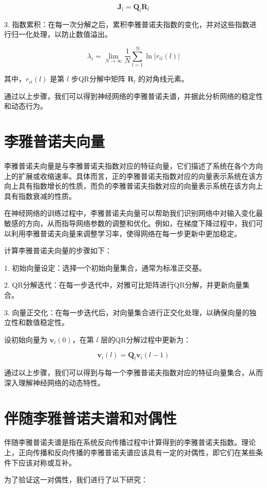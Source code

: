\[ \mathbf{J}_l = \mathbf{Q}_l \mathbf{R}_l \]

3. 指数累积：在每一次分解之后，累积李雅普诺夫指数的变化，并对这些指数进行归一化处理，以防止数值溢出。

\[ \lambda_i = \lim_{N \to \infty} \frac{1}{N} \sum_{l=1}^N \ln |r_{ii}(l)| \]

其中，\(r_{ii}(l)\) 是第 \(l\) 步QR分解中矩阵 \(\mathbf{R}_l\) 的对角线元素。

通过以上步骤，我们可以得到神经网络的李雅普诺夫谱，并据此分析网络的稳定性和动态行为。

\section{李雅普诺夫向量}

李雅普诺夫向量是与李雅普诺夫指数对应的特征向量，它们描述了系统在各个方向上的扩展或收缩速率。具体而言，正的李雅普诺夫指数对应的向量表示系统在该方向上具有指数增长的性质，而负的李雅普诺夫指数对应的向量表示系统在该方向上具有指数衰减的性质。

在神经网络的训练过程中，李雅普诺夫向量可以帮助我们识别网络中对输入变化最敏感的方向，从而指导网络参数的调整和优化。例如，在梯度下降过程中，我们可以利用李雅普诺夫向量来调整学习率，使得网络在每一步更新中更加稳定。

计算李雅普诺夫向量的步骤如下：

1. 初始向量设定：选择一个初始向量集合，通常为标准正交基。
   
2. QR分解迭代：在每一步迭代中，对雅可比矩阵进行QR分解，并更新向量集合。
   
3. 向量正交化：在每一步迭代后，对向量集合进行正交化处理，以确保向量的独立性和数值稳定性。

设初始向量为 \(\mathbf{v}_i(0)\)，在第 \(l\) 层的QR分解过程中更新为：

\[ \mathbf{v}_i(l) = \mathbf{Q}_l \mathbf{v}_i(l-1) \]

通过以上步骤，我们可以得到与每一个李雅普诺夫指数对应的特征向量集合，从而深入理解神经网络的动态特性。

\section{伴随李雅普诺夫谱和对偶性}

伴随李雅普诺夫谱是指在系统反向传播过程中计算得到的李雅普诺夫指数。理论上，正向传播和反向传播的李雅普诺夫谱应该具有一定的对偶性，即它们在某些条件下应该对称或互补。

为了验证这一对偶性，我们进行了以下研究：

